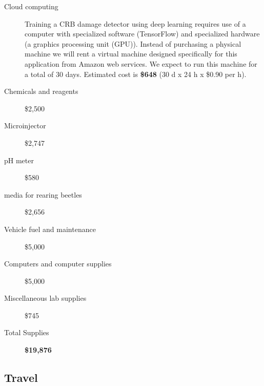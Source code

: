 \documentclass[14pt,english,letterpaper]{scrartcl}
\begin{document}
\begin{description}
	
	\item[Cloud computing] Training a CRB damage detector using deep learning requires use of a computer with specialized software (TensorFlow) and specialized hardware (a graphics processing unit (GPU)). Instead of purchasing a physical machine we will rent a virtual machine designed specifically for this application from Amazon web services. We expect to run this machine for a total of 30 days. Estimated cost is \textbf{\$648} (30 d x 24 h x \$0.90 per h).
		
	\item[Chemicals and reagents] \$2,500
	
	\item[Microinjector] \$2,747
	
	\item[pH meter]	\$580
	
	\item[media for rearing beetles]	\$2,656
	
	\item[Vehicle fuel and maintenance]	\$5,000
	
	\item[Computers and computer supplies]	\$5,000
	
	\item[Miscellaneous lab supplies]	\$745
	
	\item[Total Supplies] \textbf{\$19,876}
	
\end{description}

\subsection{Travel} 
\end{document}
